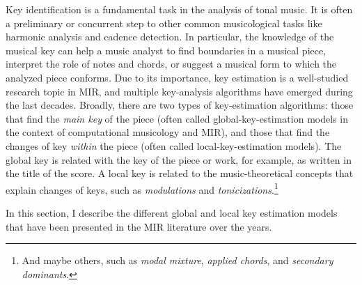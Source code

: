 

Key identification is a fundamental task in the analysis of
tonal music. It is often a preliminary or concurrent step to
other common musicological tasks like harmonic analysis and
cadence detection. In particular, the knowledge of the
musical key can help a music analyst to find boundaries in a
musical piece, interpret the role of notes and chords, or
suggest a musical form to which the analyzed piece conforms.
Due to its importance, key estimation is a well-studied
research topic in MIR, and multiple key-analysis algorithms
have emerged during the last decades. Broadly, there are two
types of key-estimation algorithms: those that find the
\emph{main key} of the piece (often called
global-key-estimation models in the context of computational
musicology and MIR), and those that find the changes of key
\emph{within} the piece (often called local-key-estimation
models). The global key is related with the key of the piece
or work, for example, as written in the title of the score.
A local key is related to the music-theoretical concepts
that explain changes of keys, such as \emph{modulations} and
\emph{tonicizations}.\footnote{And maybe others, such as
\emph{modal mixture}, \emph{applied chords}, and \emph{secondary dominants}.}

In this section, I describe the different global and local
key estimation models that have been presented in the MIR
literature over the years.

